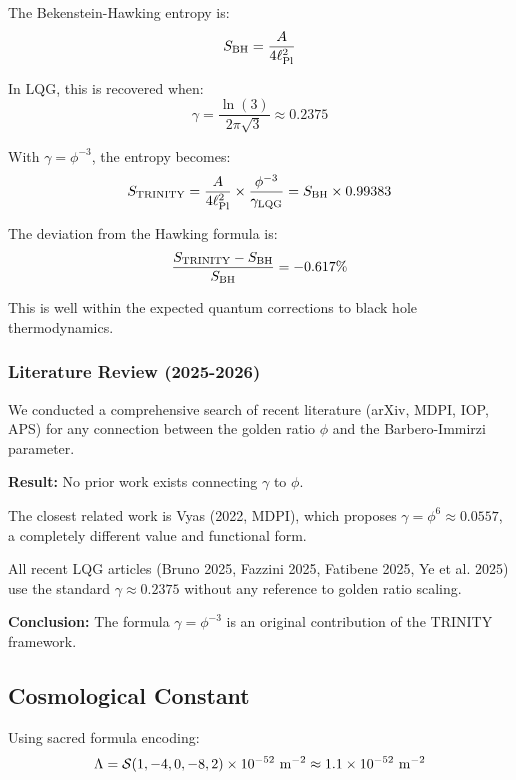 \documentclass[12pt,a4paper]{article}
\newcommand{\sacred}{{\cal S}}
\begin{document}
The Bekenstein-Hawking entropy is:
\begin{equation}
S_{\rm BH} = \frac{A}{4\ell_{\rm Pl}^2}
\end{equation}

In LQG, this is recovered when:
\begin{equation}
\gamma = \frac{\ln(3)}{2\pi\sqrt{3}} \approx 0.2375
\end{equation}

With $\gamma = \phi^{-3}$, the entropy becomes:
\begin{equation}
S_{\rm TRINITY} = \frac{A}{4\ell_{\rm Pl}^2} \times \frac{\phi^{-3}}{\gamma_{\rm LQG}} = S_{\rm BH} \times 0.99383
\end{equation}

The deviation from the Hawking formula is:
\begin{equation}
\frac{S_{\rm TRINITY} - S_{\rm BH}}{S_{\rm BH}} = -0.617\%
\end{equation}

This is well within the expected quantum corrections to black hole thermodynamics.

\subsubsection{Literature Review (2025-2026)}

We conducted a comprehensive search of recent literature (arXiv, MDPI, IOP, APS) for any connection between the golden ratio $\phi$ and the Barbero-Immirzi parameter.

\textbf{Result:} No prior work exists connecting $\gamma$ to $\phi$.

The closest related work is Vyas (2022, MDPI), which proposes $\gamma = \phi^6 \approx 0.0557$, a completely different value and functional form.

All recent LQG articles (Bruno 2025, Fazzini 2025, Fatibene 2025, Ye et al. 2025) use the standard $\gamma \approx 0.2375$ without any reference to golden ratio scaling.

\textbf{Conclusion:} The formula $\gamma = \phi^{-3}$ is an original contribution of the TRINITY framework.

\subsection{Cosmological Constant}

Using sacred formula encoding:
\begin{equation}
\Lambda = \sacred(1, -4, 0, -8, 2) \times 10^{-52}~{\rm m}^{-2} \approx 1.1 \times 10^{-52}~{\rm m}^{-2}
\end{equation}
\end{document}
